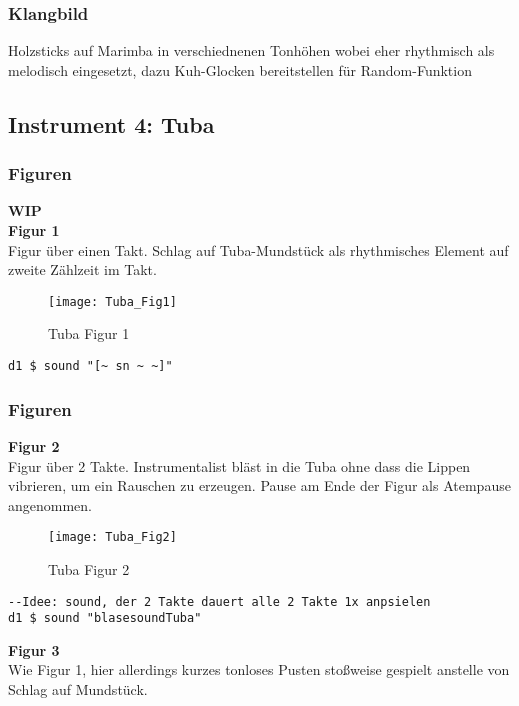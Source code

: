 \documentclass[
10pt, %
a4paper, %
oneside, %
headinclude,footinclude, %
BCOR5mm, %
]{scrartcl}
\begin{document}
\subsubsection{Klangbild}
Holzsticks auf Marimba in verschiednenen Tonhöhen wobei eher rhythmisch als melodisch eingesetzt, dazu Kuh-Glocken bereitstellen für Random-Funktion

\subsection{Instrument 4: Tuba}
\subsubsection{Figuren}
{\color{orange}\textbf{WIP}} \\

\noindent\textbf{Figur 1}\\
Figur über einen Takt. Schlag auf Tuba-Mundstück als rhythmisches Element auf zweite Zählzeit im Takt.\\
\begin{figure}[h]
	\centering 
	\texttt{[image: Tuba\_Fig1]} 
	\caption{Tuba Figur 1}
\end{figure}

\begin{lstlisting}
d1 $ sound "[~ sn ~ ~]"
\end{lstlisting}

\subsubsection{Figuren}
\textbf{Figur 2}\\
Figur über 2 Takte. Instrumentalist bläst in die Tuba ohne dass die Lippen vibrieren, um ein Rauschen zu erzeugen. Pause am Ende der Figur als Atempause angenommen. 

\begin{figure}[h]
	\centering 
	\texttt{[image: Tuba\_Fig2]} 
	\caption{Tuba Figur 2}
\end{figure}

\begin{lstlisting}
--Idee: sound, der 2 Takte dauert alle 2 Takte 1x anpsielen
d1 $ sound "blasesoundTuba"
\end{lstlisting}

\noindent\textbf{Figur 3}\\
Wie Figur 1, hier allerdings kurzes tonloses Pusten stoßweise gespielt anstelle von Schlag auf Mundstück.\\
\end{document}
